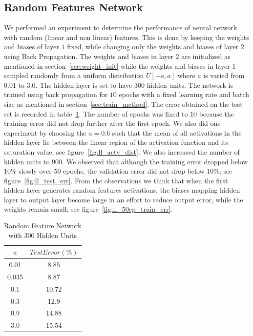 \documentclass[Proceedings]{ascelike}
\begin{document}
\subsection{Random Features Network} We performed an experiment to determine
the performance of neural network with random (linear and non linear) features.
This is done by keeping the weights and biases of layer $1$ fixed, while
changing only the weights and biases of layer $2$ using Back Propagation. The
weights and biases in layer $2$ are initialized as mentioned in
section~\ref{sec:weight_init} while the weights and biases in layer $1$ sampled
randomly from a uniform distribution $U[-a, a]$ where $a$ is varied from $0.01$
to $3.0$. The hidden layer is set to have $300$ hidden units. The network is
trained using back propagation for $10$ epochs with a fixed learning rate and
batch size as mentioned in section~\ref{sec:train_method}. The error obtained
on the test set is recorded in table~\ref{tab:terror}. The number of epochs was
fixed to $10$ because the training error did not drop further after the first
epoch. We also did one experiment by choosing the $a=0.6$ such that the mean of
all activations in the hidden layer lie between the linear region of the
activation function and its saturation value, see
figure~\ref{fig:ll_actv_dist}. We also increased the number of hidden units to
$900$. We observed that although the training error dropped below $10\%$ slowly
over $50$ epochs, the validation error did not drop below $10\%$; see
figure~\ref{fig:ll_test_err}. From the observations we think that when the
first hidden layer generates random features activations, the biases mapping
hidden layer to output layer become large in an effort to reduce output error,
while the weights remain small; see figure~\ref{fig:ll_50ep_train_err}.

\begin{table}[H] \centering \begin{tabular}{|c||c|} \hline $a$&$Test Error (\%)$\\
\hline \hline 0.01&8.85\\ 0.035&8.87\\ 0.1&10.72\\ 0.3&12.9\\
0.9&14.88\\ 3.0&15.54\\ \hline \end{tabular} \caption{Random Feature Network
with 300 Hidden Units} \label{tab:terror} \end{table}
\end{document}
